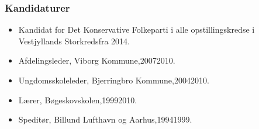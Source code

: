 \documentclass[11pt, a4paper]{awesome-cv}
\begin{document}
\begin{cvletter}
\subsubsection*{Kandidaturer}
\begin{itemize}
\item Kandidat for Det Konservative Folkeparti i alle opstillingskredse i Vestjyllands Storkredsfra 2014.
\end{itemize}
\begin{itemize}
\item Afdelingsleder, Viborg Kommune,20072010.
\item Ungdomsskoleleder, Bjerringbro Kommune,20042010.
\item Lærer, Bøgeskovskolen,19992010.
\item Speditør, Billund Lufthavn og Aarhus,19941999.
\end{itemize}
\end{cvletter}
\end{document}
